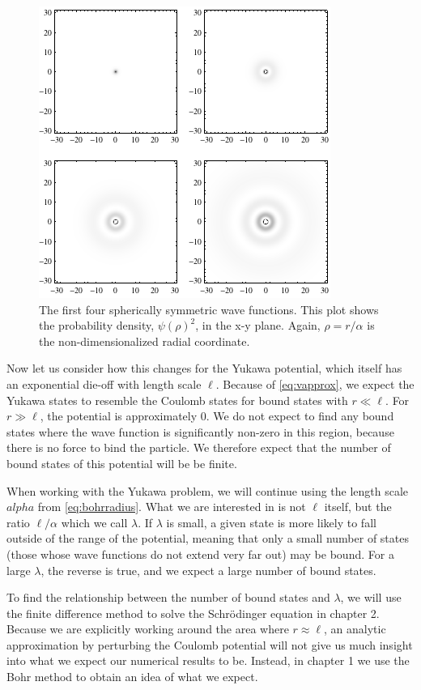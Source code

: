 \documentclass[12pt,twoside]{reedthesis}
\begin{document}
\begin{figure}[h]
\centering
\includegraphics{Figures/densityplots}
\caption[Density plots of the first four spherically symmetric Coulomb wave functions]{The first four spherically symmetric wave functions. This plot shows the probability density, $\psi(\rho)^2$, in the x-y plane. Again, $\rho = r/\alpha$ is the non-dimensionalized radial coordinate.}
\label{fig:boundstates}
\end{figure}

Now let us consider how this changes for the Yukawa potential, which itself has an exponential die-off with length scale $\ell$. Because of \eqref{eq:vapprox}, we expect the Yukawa states to resemble the Coulomb states for bound states with $r \ll \ell$. For $r \gg \ell$, the potential is approximately $0$. We do not expect to find any bound states where the wave function is significantly non-zero in this region, because there is no force to bind the particle. We therefore expect that the number of bound states of this potential will be be finite.

When working with the Yukawa problem, we will continue using the length scale $alpha$ from \eqref{eq:bohrradius}. What we are interested in is not $\ell$ itself, but the ratio $\ell / \alpha$ which we call $\lambda$.
If $\lambda$ is small, a given state is more likely to fall outside of the range of the potential, meaning that only a small number of states (those whose wave functions do not extend very far out) may be bound. For a large $\lambda$, the reverse is true, and we expect a large number of bound states.

To find the relationship between the number of bound states and $\lambda$, we will use the finite difference method to solve the Schr\"odinger equation in chapter 2. Because we are explicitly working around the area where $r \approx \ell$, an analytic approximation by perturbing the Coulomb potential \cite{PhysRevLett.66.1310} will not give us much insight into what we expect our numerical results to be. Instead, in chapter 1 we use the Bohr method to obtain an idea of what we expect.
\end{document}
